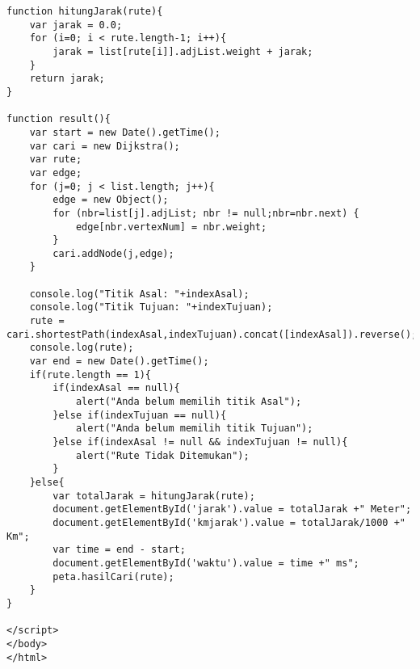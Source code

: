 \begin{lstlisting}[caption=aplikasi.html]
function hitungJarak(rute){
	var jarak = 0.0;
	for (i=0; i < rute.length-1; i++){
		jarak = list[rute[i]].adjList.weight + jarak;
	}
	return jarak;
}

function result(){
	var start = new Date().getTime();
	var cari = new Dijkstra();
	var rute;
	var edge;
	for (j=0; j < list.length; j++){
		edge = new Object();
		for (nbr=list[j].adjList; nbr != null;nbr=nbr.next) {
			edge[nbr.vertexNum] = nbr.weight;	
		}
		cari.addNode(j,edge);
	}

	console.log("Titik Asal: "+indexAsal);
	console.log("Titik Tujuan: "+indexTujuan);
	rute = cari.shortestPath(indexAsal,indexTujuan).concat([indexAsal]).reverse();
	console.log(rute);
	var end = new Date().getTime();
	if(rute.length == 1){
		if(indexAsal == null){
			alert("Anda belum memilih titik Asal");
		}else if(indexTujuan == null){
			alert("Anda belum memilih titik Tujuan");
		}else if(indexAsal != null && indexTujuan != null){
			alert("Rute Tidak Ditemukan");
		}
	}else{
		var totalJarak = hitungJarak(rute);
		document.getElementById('jarak').value = totalJarak +" Meter";
		document.getElementById('kmjarak').value = totalJarak/1000 +" Km";
		var time = end - start;
		document.getElementById('waktu').value = time +" ms";
		peta.hasilCari(rute);
	}
}

</script>
</body>
</html>
\end{lstlisting}

